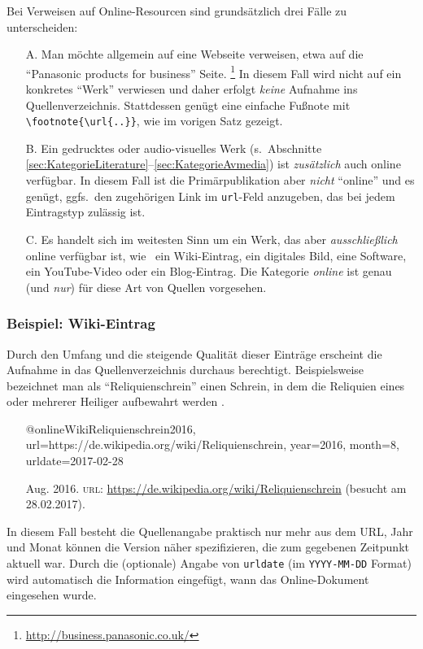 Bei Verweisen auf Online-Resourcen sind grundsätzlich drei Fälle zu unterscheiden:
%
\begin{itemize}
\item[A.] Man möchte allgemein auf eine Webseite verweisen, etwa auf die 
	"`Panasonic products for business"' Seite.%
	\footnote{\url{http://business.panasonic.co.uk/}}
	In diesem Fall wird nicht auf ein konkretes "`Werk"' verwiesen und daher
	erfolgt \emph{keine} Aufnahme ins Quellenverzeichnis. Stattdessen
	genügt eine einfache Fußnote mit \verb!\footnote{\url{..}}!, wie im vorigen
	Satz gezeigt.
\item[B.] Ein gedrucktes oder audio-visuelles Werk 
	(s.\ Abschnitte \ref{sec:KategorieLiterature}--\ref{sec:KategorieAvmedia})
	ist \emph{zusätzlich} auch online verfügbar. In diesem Fall ist die Primär\-publikation 
	aber \emph{nicht} "`online"' und es genügt, ggfs.\ den zugehörigen Link im 
	\texttt{url}-Feld anzugeben, das bei jedem Eintragstyp zulässig ist.
\item[C.] Es handelt sich im weitesten Sinn um ein Werk, das aber 
	\emph{ausschließlich} online verfügbar ist, wie \zB\ ein Wiki-Eintrag, 
	ein digitales Bild,	eine Software, ein YouTube-Video oder ein Blog-Eintrag.
	Die Kategorie \emph{online} ist genau (und \emph{nur}) für diese 
	Art von Quellen vorgesehen.
\end{itemize}




\subsubsection{Beispiel: Wiki-Eintrag}
\label{sec:@online-www}
Durch den Umfang und die steigende Qualität dieser Einträge erscheint
die Aufnahme in das Quellenverzeichnis durchaus berechtigt.
Beispielsweise bezeichnet man als "`Reliquienschrein"'
einen Schrein, in dem die Reliquien eines oder 
mehrerer Heiliger aufbewahrt werden \cite{WikiReliquienschrein2016}.
%
\begin{itemize}
\item[]
\begin{GenericCode}[numbers=none]
@online{WikiReliquienschrein2016,
	url={https://de.wikipedia.org/wiki/Reliquienschrein},
	year={2016},
	month={8},
	urldate={2017-02-28}
}
\end{GenericCode}
\item[\cite{WikiReliquienschrein2016}]
Aug. 2016. \textsc{url}: \url{https://de.wikipedia.org/wiki/Reliquienschrein}
(besucht am 28.02.{\hskip0pt}2017).
\end{itemize}
%
In diesem Fall besteht die Quellenangabe praktisch nur mehr aus dem URL, Jahr und Monat können die Version näher spezifizieren, die zum gegebenen Zeitpunkt aktuell war.
Durch die (optionale) Angabe von \texttt{urldate} (im \texttt{YYYY-MM-DD} Format) wird automatisch die Information eingefügt, wann das Online-Dokument eingesehen wurde.



